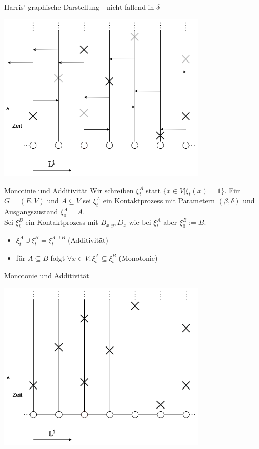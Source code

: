 \documentclass[11pt]{beamer}
\begin{document}
\begin{frame}{Harris' graphische Darstellung - nicht fallend in $\delta$}
    \begin{center}
        \includegraphics[width=0.75\textwidth]{images/contact process dotted crosses.png}
    \end{center}
\end{frame}

\begin{frame}{Monotinie und Additivität}
    Wir schreiben $\xi_t^A$ statt $\{x \in V | \xi_t(x) = 1\}$.
    Für $G = (E, V)$ und $A \subseteq V$ sei $\xi_t^A$ ein Kontaktprozess mit
    Parametern $(\beta, \delta)$ und Ausgangszustand $\xi_0^A = A$. 
    \\
    Sei $\xi_t^B$ ein Kontaktprozess mit $B_{x,y}, D_x$ wie bei $\xi_t^A$ aber $\xi_0^B := B$. 
    \begin{itemize}
        \item<2-> $\xi_t^A \cup \xi_t^B = \xi_t^{A \cup B}$ (Additivität)
        \item<3-> für $A \subseteq B$ folgt $\forall x \in V : \xi_t^A \subseteq \xi_t^B$ (Monotonie)
    \end{itemize}
\end{frame}

\begin{frame}{Monotonie und Additivität}
    \begin{center}
        \includegraphics[width=0.75\textwidth]{images/contact process crosses.png}
    \end{center}
\end{frame}
\end{document}
